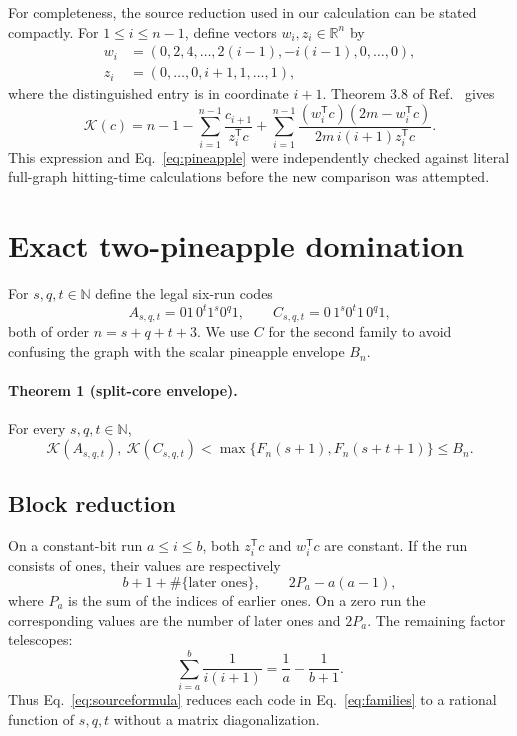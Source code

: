 \documentclass[11pt]{article}
\newcommand{\K}{\mathcal{K}}
\newcommand{\N}{\mathbb{N}}
\begin{document}
For completeness, the source reduction used in our calculation can be stated
compactly.  For $1\leq i\leq n-1$, define vectors $w_i,z_i\in\mathbb R^n$ by
\begin{align}
 w_i&=(0,2,4,\ldots,2(i-1),-i(i-1),0,\ldots,0),\\
 z_i&=(0,\ldots,0,i+1,1,\ldots,1),
\end{align}
where the distinguished entry is in coordinate $i+1$.  Theorem 3.8 of
Ref.~\cite{BreenEtAl2025} gives
\begin{equation}
 \K(c)=n-1-\sum_{i=1}^{n-1}\frac{c_{i+1}}{z_i^{\mathsf T}c}
 +\sum_{i=1}^{n-1}
 \frac{(w_i^{\mathsf T}c)(2m-w_i^{\mathsf T}c)}
 {2m\,i(i+1)z_i^{\mathsf T}c}.
 \label{eq:sourceformula}
\end{equation}
This expression and Eq.~\eqref{eq:pineapple} were independently checked
against literal full-graph hitting-time calculations before the new comparison
was attempted.

\section{Exact two-pineapple domination}
\label{sec:theorem}

For $s,q,t\in\N$ define the legal six-run codes
\begin{equation}
 A_{s,q,t}=01\,0^t1^s0^q1,
 \qquad
 C_{s,q,t}=0\,1^s0^t1\,0^q1,
 \label{eq:families}
\end{equation}
both of order $n=s+q+t+3$.  We use $C$ for the second family to avoid
confusing the graph with the scalar pineapple envelope $B_n$.

\paragraph{Theorem 1 (split-core envelope).}
For every $s,q,t\in\N$,
\begin{equation}
 \K(A_{s,q,t}),\ \K(C_{s,q,t})
 <\max\{F_n(s+1),F_n(s+t+1)\}\leq B_n.
 \label{eq:main}
\end{equation}

\subsection{Block reduction}

On a constant-bit run $a\leq i\leq b$, both $z_i^{\mathsf T}c$ and
$w_i^{\mathsf T}c$ are constant.  If the run consists of ones, their values
are respectively
\begin{equation}
 b+1+\#\{\text{later ones}\},
 \qquad 2P_a-a(a-1),
\end{equation}
where $P_a$ is the sum of the indices of earlier ones.  On a zero run the
corresponding values are the number of later ones and $2P_a$.  The remaining
factor telescopes:
\begin{equation}
 \sum_{i=a}^{b}\frac{1}{i(i+1)}=\frac1a-\frac1{b+1}.
 \label{eq:telescope}
\end{equation}
Thus Eq.~\eqref{eq:sourceformula} reduces each code in Eq.~\eqref{eq:families}
to a rational function of $s,q,t$ without a matrix diagonalization.
\end{document}
